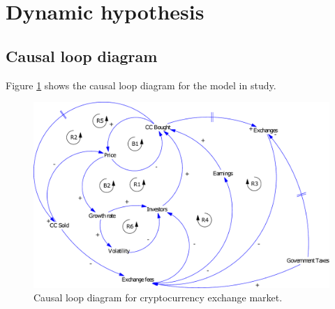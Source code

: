 \section{Dynamic hypothesis}
\subsection{Causal loop diagram}
Figure \ref{img:causalloop} shows the causal loop diagram for the model in study.
\begin{figure}[H]
	\centering
    \includegraphics[scale=0.75]{files/CausalLoopDiagram.pdf}
    \caption{Causal loop diagram for cryptocurrency exchange market.}
    \label{img:causalloop}
\end{figure}
